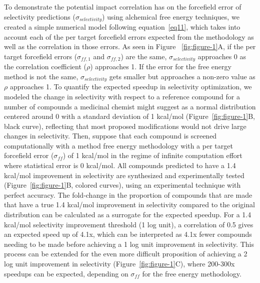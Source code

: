 \documentclass[9pt,lineno]{elife-modified} %
\begin{document}
To demonstrate the potential impact correlation has on the forcefield error of selectivity predictions ($\sigma_{selectivity}$) using alchemical free energy techniques, we created a simple numerical model following equation~\ref{eq11}, which takes into account each of the per target forcefield errors expected from the methodology as well as the correlation in those errors. As seen in Figure ~\ref{fig:figure-1}A, if the per target forcefield errors ($\sigma_{ff,1}$ and $\sigma_{ff,2}$) are the same, $\sigma_{selectivity}$ approaches 0 as the correlation coefficient ($\rho$) approaches 1. If the error for the free energy method is not the same, $\sigma_{selectivity}$ gets smaller but approaches a non-zero value as $\rho$ approaches 1. 
To quantify the expected speedup in selectivity optimization, we modeled the change in selectivity with respect to a reference compound for a number of compounds a medicinal chemist might suggest as a normal distribution centered around 0 with a standard deviation of 1 kcal/mol (Figure~\ref{fig:figure-1}B, black curve), reflecting that most proposed modifications would not drive large changes in selectivity. Then, suppose that each compound is screened computationally with a method free energy methodology with a per target forcefield error ($\sigma_{ff}$) of 1 kcal/mol in the regime of infinite computation effort where statistical error is 0 kcal/mol. All compounds predicted to have a 1.4 kcal/mol improvement in selectivity are synthesized and experimentally tested (Figure~\ref{fig:figure-1}B, colored curves), using an experimental technique with perfect accuracy. The fold-change in the proportion of compounds that are made that have a true 1.4 kcal/mol improvement in selectivity compared to the original distribution can be calculated as a surrogate for the expected speedup. For a 1.4 kcal/mol selectivity improvement threshold (1 log unit), a correlation of 0.5 gives an expected speed up of 4.1x, which can be interpreted as 4.1x fewer compounds needing to be made before achieving a 1 log unit improvement in selectivity. This process can be extended for the even more difficult proposition of achieving a 2 log unit improvement in selectivity (Figure~\ref{fig:figure-1}C), where 200-300x speedups can be expected, depending on $\sigma_{ff}$ for the free energy methodology. 
\end{document}
